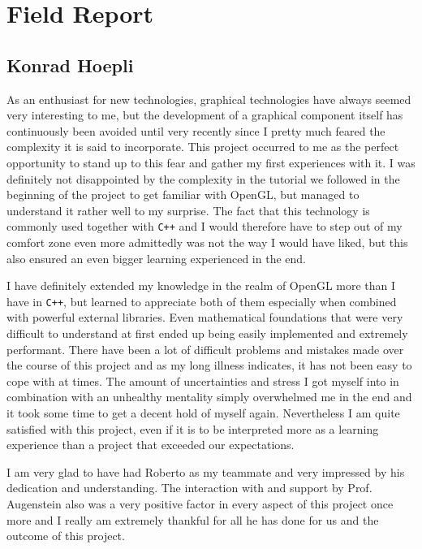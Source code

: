 \section{Field Report}

\subsection{Konrad Hoepli}

As an enthusiast for new technologies, graphical technologies have always seemed very interesting to me, but the development of a graphical component itself has continuously been avoided until very recently since I pretty much feared the complexity it is said to incorporate. This project occurred to me as the perfect opportunity to stand up to this fear and gather my first experiences with it.
I was definitely not disappointed by the complexity in the tutorial we followed in the beginning of the project to get familiar with OpenGL, but managed to understand it rather well to my surprise. The fact that this technology is commonly used together with \verb|C++| and I would therefore have to step out of my comfort zone even more admittedly was not the way I would have liked, but this also ensured an even bigger learning experienced in the end.

I have definitely extended my knowledge in the realm of OpenGL more than I have in \verb|C++|, but learned to appreciate both of them especially when combined with powerful external libraries. Even mathematical foundations that were very difficult to understand at first ended up being easily implemented and extremely performant.
There have been a lot of difficult problems and mistakes made over the course of this project and as my long illness indicates, it has not been easy to cope with at times. The amount of uncertainties and stress I got myself into in combination with an unhealthy mentality simply overwhelmed me in the end and it took some time to get a decent hold of myself again.
Nevertheless I am quite satisfied with this project, even if it is to be interpreted more as a learning experience than a project that exceeded our expectations.

I am very glad to have had Roberto as my teammate and very impressed by his dedication and understanding. The interaction with and support by Prof. Augenstein also was a very positive factor in every aspect of this project once more and I really am extremely thankful for all he has done for us and the outcome of this project.


